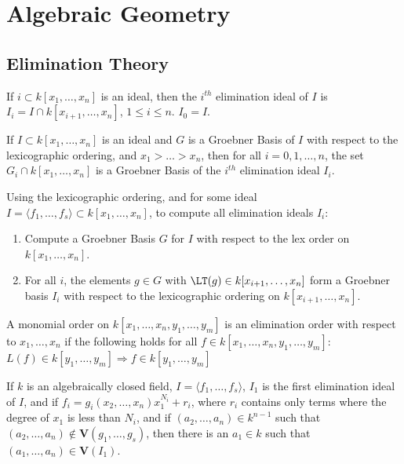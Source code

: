 \documentclass[crop=false,class=article,oneside]{standalone}
\begin{document}
    \ifx\ifgeoalg\undefined
        \section*{Algebraic Geometry}
        \setcounter{section}{1}
    \fi
\subsection{Elimination Theory}
    \begin{definition}
    If $i\subset k[x_1,\hdots ,x_n]$ is an ideal, then the $i^{th}$ elimination ideal of $I$ is $I_{i} = I\cap k[x_{i+1},\hdots, x_n]$, $1\leq i \leq n$. $I_{0} = I$.
    \end{definition}
    \begin{theorem}
    If $I\subset k[x_1,\hdots ,x_n]$ is an ideal and $G$ is a Groebner Basis of $I$ with respect to the lexicographic ordering, and $x_1>\hdots > x_n$, then for all $i=0,1,\hdots, n$, the set $G_i \cap k[x_1,\hdots ,x_n]$ is a Groebner Basis of the $i^{th}$ elimination ideal $I_{i}$.
    \end{theorem}
    \begin{remark}
    Using the lexicographic ordering, and for some ideal $I = \langle f_1,\hdots, f_s\rangle \subset k[x_1,\hdots ,x_n]$, to compute all elimination ideals $I_{i}$:
    \begin{enumerate}
        \item Compute a Groebner Basis $G$ for $I$ with respect to the lex order on $k[x_1,\hdots ,x_n]$.
        \item For all $i$, the elements $g\in G$ with $\LT(g)\in k[x_{i+1},\hdots, x_n]$ form a Groebner basis $I_{i}$ with respect to the lexicographic ordering on $k[x_{i+1},\hdots, x_n]$.
    \end{enumerate}
    \end{remark}
    \begin{definition}
    A monomial order on $k[x_1,\hdots, x_n,y_1,\hdots, y_m]$ is an elimination order with respect to $x_1,\hdots, x_n$ if the following holds for all $f\in k[x_1,\hdots, x_n, y_1, \hdots, y_m]$: $L(f) \in k[y_1,\hdots, y_m] \Rightarrow f\in k[y_1,\hdots, y_m]$
    \end{definition}
    \begin{theorem}
    If $k$ is an algebraically closed field, $I = \langle f_1,\hdots, f_s\rangle$, $I_{1}$ is the first elimination ideal of $I$, and if $f_i = g_i(x_2,\hdots, x_n)x_1^{N_i}+r_i$, where $r_i$ contains only terms where the degree of $x_1$ is less than $N_i$, and if $(a_2,\hdots, a_n)\in k^{n-1}$ such that $(a_2,\hdots, a_n) \notin \mathbf{V}(g_1,\hdots, g_s)$, then there is an $a_1 \in k$ such that $(a_1,\hdots, a_n) \in \mathbf{V}(I_1)$.
    \end{theorem}
\end{document}
